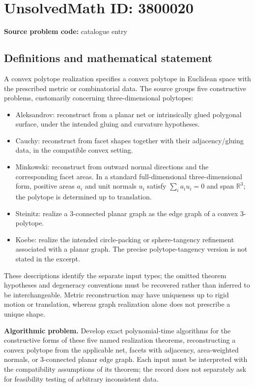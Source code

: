 \documentclass[11pt]{article}
\newcommand{\R}{\mathbb{R}}
\begin{document}
\section*{UnsolvedMath ID: 3800020}
\textbf{Source problem code:} catalogue entry
\subsection{Definitions and mathematical statement}
A convex polytope realization specifies a convex polytope in Euclidean space with the prescribed metric or combinatorial data. The source groups five constructive problems, customarily concerning three-dimensional polytopes:
\begin{itemize}
\item Aleksandrov: reconstruct from a planar net or intrinsically glued polygonal surface, under the intended gluing and curvature hypotheses.
\item Cauchy: reconstruct from facet shapes together with their adjacency/gluing data, in the compatible convex setting.
\item Minkowski: reconstruct from outward normal directions and the corresponding facet areas. In a standard full-dimensional three-dimensional form, positive areas $a_i$ and unit normals $u_i$ satisfy $\sum_i a_i u_i=0$ and span $\R^3$; the polytope is determined up to translation.
\item Steinitz: realize a $3$-connected planar graph as the edge graph of a convex $3$-polytope.
\item Koebe: realize the intended circle-packing or sphere-tangency refinement associated with a planar graph. The precise polytope-tangency version is not stated in the excerpt.
\end{itemize}
These descriptions identify the separate input types; the omitted theorem hypotheses and degeneracy conventions must be recovered rather than inferred to be interchangeable. Metric reconstruction may have uniqueness up to rigid motion or translation, whereas graph realization alone does not prescribe a unique shape.

\textbf{Algorithmic problem.} Develop exact polynomial-time algorithms for the constructive forms of these five named realization theorems, reconstructing a convex polytope from the applicable net, facets with adjacency, area-weighted normals, or $3$-connected planar edge graph. Each input must be interpreted with the compatibility assumptions of its theorem; the record does not separately ask for feasibility testing of arbitrary inconsistent data.
\end{document}
